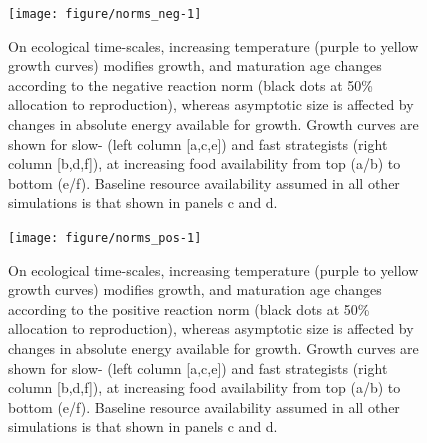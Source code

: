 \documentclass[11pt]{article}\usepackage[]{graphicx}\usepackage[]{color,soul}
\begin{document}
\begin{figure}[!ht]
{\centering 
\texttt{[image: figure/norms\_neg-1]} 
}
\caption[On ecological time-scales, increasing temperature (purple to yellow growth curves) modifies growth, and maturation age changes according to the negative reaction norm (black dots at 50\% allocation to reproduction), whereas asymptotic size is affected by changes in absolute energy available for growth]{On ecological time-scales, increasing temperature (purple to yellow growth curves) modifies growth, and maturation age changes according to the negative reaction norm (black dots at 50\% allocation to reproduction), whereas asymptotic size is affected by changes in absolute energy available for growth. Growth curves are shown for slow- (left column [a,c,e]) and fast strategists (right column [b,d,f]), at increasing food availability from top (a/b) to bottom (e/f). Baseline resource availability assumed in all other simulations is that shown in panels c and d.}\label{fig:norms_neg}
\end{figure}

\begin{figure}[!ht]
{\centering 
\texttt{[image: figure/norms\_pos-1]} 
}
\caption[On ecological time-scales, increasing temperature (purple to yellow growth curves) modifies growth, and maturation age changes according to the positive reaction norm (black dots at 50\% allocation to reproduction), whereas asymptotic size is affected by changes in absolute energy available for growth]{On ecological time-scales, increasing temperature (purple to yellow growth curves) modifies growth, and maturation age changes according to the positive reaction norm (black dots at 50\% allocation to reproduction), whereas asymptotic size is affected by changes in absolute energy available for growth. Growth curves are shown for slow- (left column [a,c,e]) and fast strategists (right column [b,d,f]), at increasing food availability from top (a/b) to bottom (e/f). Baseline resource availability assumed in all other simulations is that shown in panels c and d.}\label{fig:norms_pos}
\end{figure}
\end{document}
